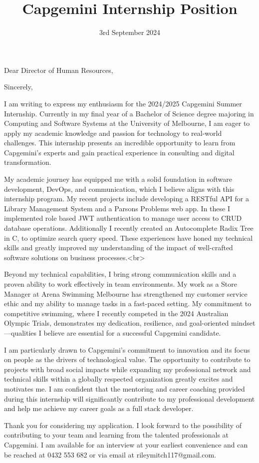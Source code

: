 \documentclass[11pt,a4paper,sans]{moderncv}        %
\title{Capgemini Internship Position}                               %
\begin{document}
\date{3rd September 2024}
\opening{Dear Director of Human Resources,}
\closing{Sincerely,}

\makelettertitle

I am writing to express my enthusiasm for the 2024/2025 Capgemini Summer Internship. Currently in my final year of a Bachelor of Science degree majoring in Computing and Software Systems at the University of Melbourne, I am eager to apply my academic knowledge and passion for technology to real-world challenges. This internship presents an incredible opportunity to learn from Capgemini's experts and gain practical experience in consulting and digital transformation.


My academic journey has equipped me with a solid foundation in software development, DevOps, and communication, which I believe aligns with this internship program. My recent projects include developing a RESTful API for a Library Management System and a Parsons Problems web app. In these I implemented role based JWT authentication to manage user access to CRUD database operations. Additionally I recently created an Autocomplete Radix Tree in C, to optimize search query speed. These experiences have honed my technical skills and greatly improved my understanding of the impact of well-crafted software solutions on business processes.<br>


Beyond my technical capabilities, I bring strong communication skills and a proven ability to work effectively in team environments. My work as a Store Manager at Arena Swimming Melbourne has strengthened my customer service ethic and my ability to manage tasks in a fast-paced setting. My commitment to competitive swimming, where I recently competed in the 2024 Australian Olympic Trials, demonstrates my dedication, resilience, and goal-oriented mindset—qualities I believe are essential for a successful Capgemini candidate.


I am particularly drawn to Capgemini's commitment to innovation and its focus on people as the drivers of technological value. The opportunity to contribute to projects with broad social impacts while expanding my professional network and technical skills within a globally respected organization greatly excites and motivates me. I am confident that the mentoring and career coaching provided during this internship will significantly contribute to my professional development and help me achieve my career goals as a full stack developer.


Thank you for considering my application. I look forward to the possibility of contributing to your team and learning from the talented professionals at Capgemini. I am available for an interview at your earliest convenience and can be reached at 0432 553 682 or via email at rileymitch117@gmail.com.
\makeletterclosing
\end{document}
